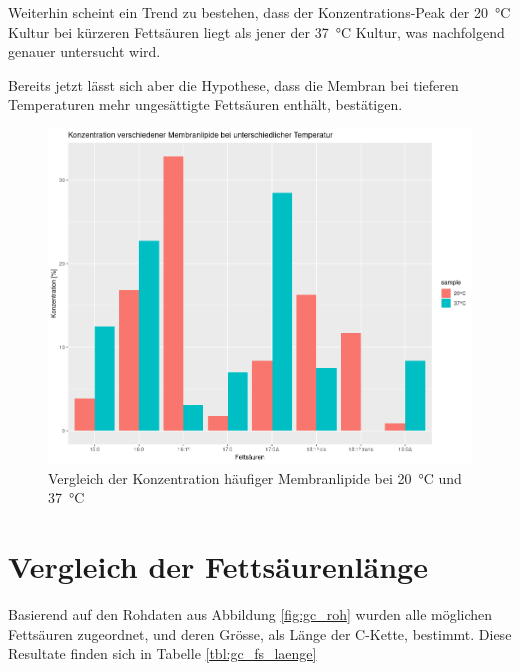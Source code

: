 \documentclass[a4paper,english]{scrreprt}
\begin{document}
Weiterhin scheint ein Trend zu bestehen, dass der Konzentrations-Peak der
\SI{20}{\celsius} Kultur bei kürzeren Fettsäuren liegt als jener der
\SI{37}{\celsius} Kultur, was nachfolgend genauer untersucht wird.

Bereits jetzt lässt sich aber die Hypothese, dass die Membran bei tieferen
Temperaturen mehr ungesättigte Fettsäuren enthält, bestätigen.

\begin{figure}
	\centering
	\includegraphics[width=\textwidth]{img/gc_membranlipide.png}
	\caption{Vergleich der Konzentration häufiger Membranlipide bei \SI{20}{\celsius} und \SI{37}{\celsius}}
	\label{fig:gc_fs_haeufig}
\end{figure}

\section{Vergleich der Fettsäurenlänge}

Basierend auf den Rohdaten aus Abbildung \ref{fig:gc_roh} wurden alle möglichen
Fettsäuren zugeordnet, und deren Grösse, als Länge der C-Kette, bestimmt. Diese
Resultate finden sich in Tabelle \ref{tbl:gc_fs_laenge}
\end{document}
